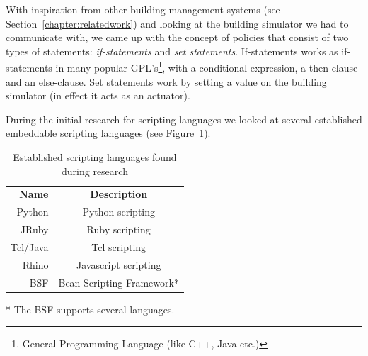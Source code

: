 With inspiration from other building management systems (see Section~\ref{chapter:relatedwork}) and looking at the building simulator we had to communicate with, we came up with the concept of policies that consist of two types of statements: \textit{if-statements} and \textit{set statements}. If-statements works as if-statements in many popular GPL's\footnote{General Programming Language (like C++, Java etc.)}, with a conditional expression, a then-clause and an else-clause. Set statements work by setting a value on the building simulator (in effect it acts as an actuator).

During the initial research for scripting languages we looked at several established embeddable scripting languages (see Figure~\ref{tbl:design-scripting-languages}).

\begin{table}[h]
	\center
	\begin{tabular}{rc}
		\textbf{Name}	&	\textbf{Description}\\
		Python	&	Python scripting\\
		JRuby	&	Ruby scripting\\
		Tcl/Java	&	Tcl scripting\\
		Rhino	&	Javascript scripting\\
		BSF		&	Bean Scripting Framework*
	\end{tabular}
	\caption{Established scripting languages found during research}\label{tbl:design-scripting-languages}
\end{table}

* The BSF supports several languages.

